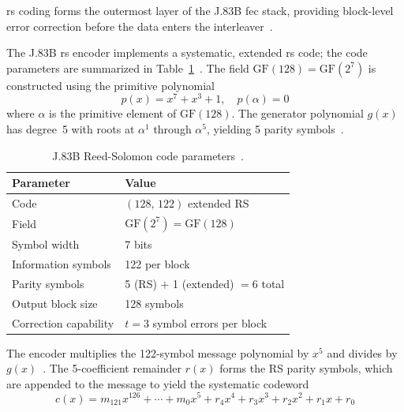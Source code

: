 \ac{rs} coding forms the outermost layer of the J.83B \ac{fec} stack,
providing block-level error correction before the data enters the
interleaver~\cite{ITU_J83}.

The J.83B \ac{rs} encoder implements a systematic, extended \ac{rs}
code; the code parameters are summarized in
Table~\ref{tab:rs_params}~\cite{ITU_J83}.
The field $\mathrm{GF}(128) = \mathrm{GF}(2^7)$ is constructed
using the primitive polynomial~\cite{ITU_J83}
\begin{equation}
  p(x) = x^7 + x^3 + 1, \quad p(\alpha) = 0
  \label{eq:rs_primitive_poly}
\end{equation}
\label{eq:rand_reduction_poly}%
\noindent where $\alpha$ is the primitive element of $\mathrm{GF}(128)$.
The generator polynomial $g(x)$ has degree~5 with roots at $\alpha^1$
through $\alpha^5$, yielding 5 parity symbols~\cite{ITU_J83}.

\begin{table}[htbp]
  \caption{J.83B Reed-Solomon code parameters~\cite{ITU_J83}.}
  \label{tab:rs_params}
  \centering
  \begin{tabular}{ll}
    \hline
    Parameter              & Value \\
    \hline
    Code                   & $(128,\,122)$ extended RS \\
    Field                  & $\mathrm{GF}(2^7) = \mathrm{GF}(128)$ \\
    Symbol width           & 7 bits \\
    Information symbols    & 122 per block \\
    Parity symbols         & 5 (RS) $+$ 1 (extended) $= 6$ total \\
    Output block size      & 128 symbols \\
    Correction capability  & $t = 3$ symbol errors per block \\
    \hline
  \end{tabular}
\end{table}

The encoder multiplies the 122-symbol message polynomial by $x^5$
and divides by $g(x)$~\cite{ITU_J83}.
The 5-coefficient remainder $r(x)$ forms the RS parity symbols,
which are appended to the message to yield the systematic
codeword~\cite{ITU_J83}
\begin{equation}
  c(x) = m_{121}x^{126} + \cdots + m_0 x^5
        + r_4 x^4 + r_3 x^3 + r_2 x^2 + r_1 x + r_0
  \label{eq:rs_codeword}
\end{equation}

